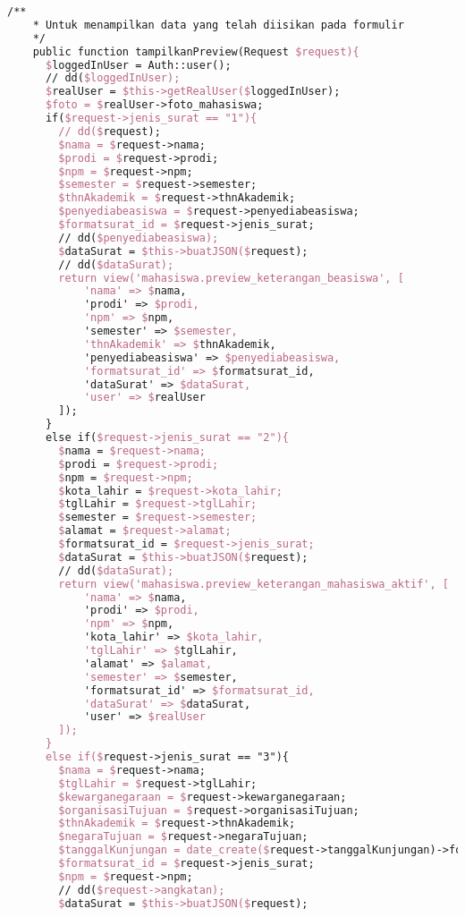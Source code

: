\begin{lstlisting}[language=tex,basicstyle=\tiny,caption=PesanansuratController.php]
    /**
    * Untuk menampilkan data yang telah diisikan pada formulir
    */
    public function tampilkanPreview(Request $request){
      $loggedInUser = Auth::user();
      // dd($loggedInUser);
      $realUser = $this->getRealUser($loggedInUser);
      $foto = $realUser->foto_mahasiswa;
      if($request->jenis_surat == "1"){
        // dd($request);
        $nama = $request->nama;
        $prodi = $request->prodi;
        $npm = $request->npm;
        $semester = $request->semester;
        $thnAkademik = $request->thnAkademik;
        $penyediabeasiswa = $request->penyediabeasiswa;
        $formatsurat_id = $request->jenis_surat;
        // dd($penyediabeasiswa);
        $dataSurat = $this->buatJSON($request);
        // dd($dataSurat);
        return view('mahasiswa.preview_keterangan_beasiswa', [
            'nama' => $nama,
            'prodi' => $prodi,
            'npm' => $npm,
            'semester' => $semester,
            'thnAkademik' => $thnAkademik,
            'penyediabeasiswa' => $penyediabeasiswa,
            'formatsurat_id' => $formatsurat_id,
            'dataSurat' => $dataSurat,
            'user' => $realUser
        ]);
      }
      else if($request->jenis_surat == "2"){
        $nama = $request->nama;
        $prodi = $request->prodi;
        $npm = $request->npm;
        $kota_lahir = $request->kota_lahir;
        $tglLahir = $request->tglLahir;
        $semester = $request->semester;
        $alamat = $request->alamat;
        $formatsurat_id = $request->jenis_surat;
        $dataSurat = $this->buatJSON($request);
        // dd($dataSurat);
        return view('mahasiswa.preview_keterangan_mahasiswa_aktif', [
            'nama' => $nama,
            'prodi' => $prodi,
            'npm' => $npm,
            'kota_lahir' => $kota_lahir,
            'tglLahir' => $tglLahir,
            'alamat' => $alamat,
            'semester' => $semester,
            'formatsurat_id' => $formatsurat_id,
            'dataSurat' => $dataSurat,
            'user' => $realUser
        ]);
      }
      else if($request->jenis_surat == "3"){
        $nama = $request->nama;
        $tglLahir = $request->tglLahir;
        $kewarganegaraan = $request->kewarganegaraan;
        $organisasiTujuan = $request->organisasiTujuan;
        $thnAkademik = $request->thnAkademik;
        $negaraTujuan = $request->negaraTujuan;
        $tanggalKunjungan = date_create($request->tanggalKunjungan)->format("j F Y");
        $formatsurat_id = $request->jenis_surat;
        $npm = $request->npm;
        // dd($request->angkatan);
        $dataSurat = $this->buatJSON($request);

\end{lstlisting}
